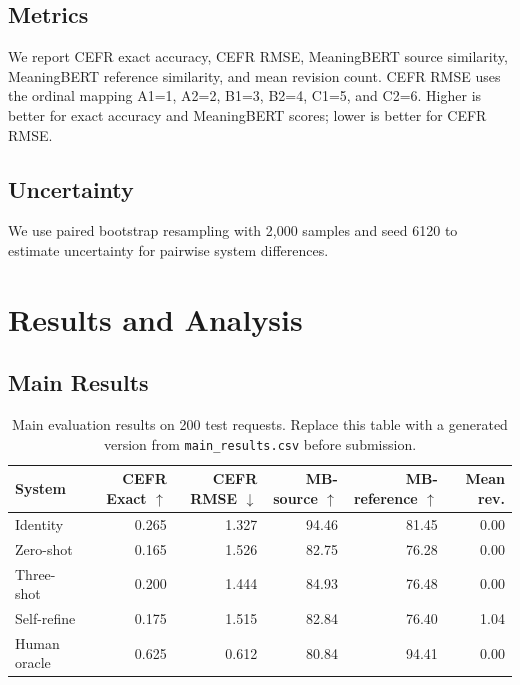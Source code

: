 \documentclass[11pt]{article}
\begin{document}
\subsection{Metrics}

We report CEFR exact accuracy, CEFR RMSE, MeaningBERT source similarity, MeaningBERT reference similarity, and mean revision count. CEFR RMSE uses the ordinal mapping A1=1, A2=2, B1=3, B2=4, C1=5, and C2=6. Higher is better for exact accuracy and MeaningBERT scores; lower is better for CEFR RMSE.

\subsection{Uncertainty}

We use paired bootstrap resampling with 2,000 samples and seed 6120 to estimate uncertainty for pairwise system differences.

\section{Results and Analysis}

\subsection{Main Results}

\begin{table}[t]
\centering
\small
\begin{tabular}{lrrrrr}
\toprule
System & CEFR Exact $\uparrow$ & CEFR RMSE $\downarrow$ & MB-source $\uparrow$ & MB-reference $\uparrow$ & Mean rev. \\
\midrule
Identity & 0.265 & 1.327 & 94.46 & 81.45 & 0.00 \\
Zero-shot & 0.165 & 1.526 & 82.75 & 76.28 & 0.00 \\
Three-shot & 0.200 & 1.444 & 84.93 & 76.48 & 0.00 \\
Self-refine & 0.175 & 1.515 & 82.84 & 76.40 & 1.04 \\
Human oracle & 0.625 & 0.612 & 80.84 & 94.41 & 0.00 \\
\bottomrule
\end{tabular}
\caption{Main evaluation results on 200 test requests. Replace this table with a generated version from \texttt{main\_results.csv} before submission.}
\label{tab:main-results}
\end{table}
\end{document}

